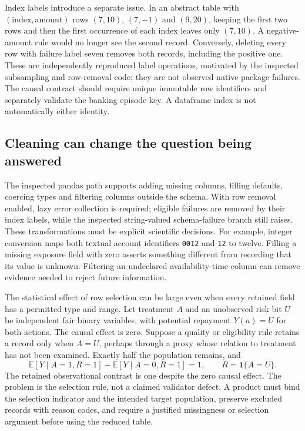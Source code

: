 Index labels introduce a separate issue. In an abstract table with
$(\text{index},\text{amount})$ rows $(7,10)$, $(7,-1)$ and $(9,20)$,
keeping the first two rows and then the first occurrence of each index leaves
only $(7,10)$. A negative-amount rule would no longer see the second record.
Conversely, deleting every row with failure label seven removes both records,
including the positive one. These are independently reproduced label
operations, motivated by the inspected subsampling and row-removal code;
they are not observed native package failures. The causal contract should
require unique immutable row identifiers and separately validate the banking
episode key. A dataframe index is not automatically either identity.
\citep{exec24_pandera_source,exec24_pandera_reference}

\subsection{Cleaning can change the question being answered}
The inspected pandas path supports adding missing columns, filling defaults,
coercing types and filtering columns outside the schema. With row removal
enabled, lazy error collection is required; eligible failures are removed by
their index labels, while the inspected string-valued schema-failure branch
still raises. These transformations must be explicit scientific decisions.
For example, integer conversion maps both textual account identifiers
\texttt{0012} and \texttt{12} to twelve. Filling a missing exposure field with
zero asserts something different from recording that its value is unknown.
Filtering an undeclared availability-time column can remove evidence needed
to reject future information.\citep{exec24_pandera_source,exec24_pandera_reference}

The statistical effect of row selection can be large even when every
retained field has a permitted type and range. Let treatment $A$ and an
unobserved risk bit $U$ be independent fair binary variables, with potential
repayment $Y(a)=U$ for both actions. The causal effect is zero. Suppose a
quality or eligibility rule retains a record only when $A=U$, perhaps through
a proxy whose relation to treatment has not been examined. Exactly half the
population remains, and
\begin{equation}
 \mathbb E[Y\mid A=1,R=1]-\mathbb E[Y\mid A=0,R=1]=1,
 \qquad R=\mathbf1\{A=U\}.
\end{equation}
The retained observational contrast is one despite the zero causal effect.
The problem is the selection rule, not a claimed validator defect. A product
must bind the selection indicator and the intended target population, preserve
excluded records with reason codes, and require a justified missingness or
selection argument before using the reduced table.\citep{exec24_pandera_reference}


